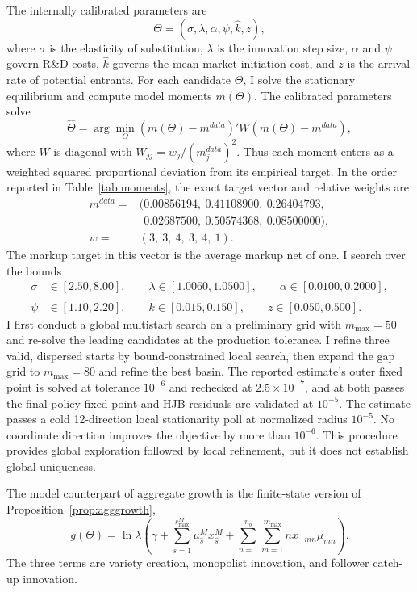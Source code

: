 \documentclass[12pt]{article}
\begin{document}
The internally calibrated parameters are
\[
\Theta=(\sigma,\lambda,\alpha,\psi,\hat k,z),
\]
where \(\sigma\) is the elasticity of substitution, \(\lambda\) is the innovation step size, \(\alpha\) and \(\psi\) govern R\&D costs, \(\hat k\) governs the mean market-initiation cost, and \(z\) is the arrival rate of potential entrants. For each candidate \(\Theta\), I solve the stationary equilibrium and compute model moments \(m(\Theta)\). The calibrated parameters solve
\[
\hat\Theta=\arg\min_{\Theta}\left(m(\Theta)-m^{data}\right)'W\left(m(\Theta)-m^{data}\right),
\]
where \(W\) is diagonal with \(W_{jj}=w_j/(m^{data}_j)^2\). Thus each moment enters as a weighted squared proportional deviation from its empirical target. In the order reported in Table~\ref{tab:moments}, the exact target vector and relative weights are
\[
\begin{aligned}
m^{data}={}&(0.00856194,\ 0.41108900,\ 0.26404793,\\
             &\phantom{(}0.02687500,\ 0.50574368,\ 0.08500000),\\
w={}&(3,\ 3,\ 4,\ 3,\ 4,\ 1).
\end{aligned}
\]
The markup target in this vector is the average markup net of one. I search over the bounds
\[
\begin{split}
\sigma&\in[2.50,8.00],\qquad
\lambda\in[1.0060,1.0500],\qquad
\alpha\in[0.0100,0.2000],\\
\psi&\in[1.10,2.20],\qquad
\hat k\in[0.015,0.150],\qquad
z\in[0.050,0.500].
\end{split}
\]
I first conduct a global multistart search on a preliminary grid with \(m_{\max}=50\) and re-solve the leading candidates at the production tolerance. I refine three valid, dispersed starts by bound-constrained local search, then expand the gap grid to \(m_{\max}=80\) and refine the best basin. The reported estimate's outer fixed point is solved at tolerance \(10^{-6}\) and rechecked at \(2.5\times10^{-7}\), and at both passes the final policy fixed point and HJB residuals are validated at \(10^{-5}\). The estimate passes a cold 12-direction local stationarity poll at normalized radius \(10^{-5}\). No coordinate direction improves the objective by more than \(10^{-6}\). This procedure provides global exploration followed by local refinement, but it does not establish global uniqueness.

The model counterpart of aggregate growth is the finite-state version of Proposition~\ref{prop:agggrowth},
\[
g(\Theta)=\ln\lambda\left(\gamma+\sum_{\hat s=1}^{s_{\max}^M}\mu^M_{\hat s}x^M_{\hat s}+\sum_{n=1}^{n_b}\sum_{m=1}^{m_{\max}}n x_{-mn}\mu_{mn}\right).
\]
The three terms are variety creation, monopolist innovation, and follower catch-up innovation.
\end{document}
